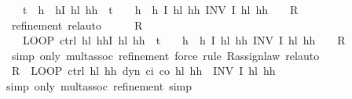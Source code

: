 \documentclass[envcountsame,envcountsect]{llncs}
\begin{document}
\begin{example}
\begin{isabellebody}
\ \ \ {\isacharparenleft}{\isacharparenleft}t\ {\isacharcolon}{\isacharcolon}{\isacharequal}\ {}{\isacharparenright}{\isacharsemicolon}{\isacharparenleft}h\ {\isacharcolon}{\isacharcolon}{\isacharequal}\ h{\isacharparenright}{\isacharsemicolon}\isactrlbold {\isacharbrackleft}I\ h\isactrlsub l\ h\isactrlsub h\ {\isasymand}\ t\ {\isacharequal}\ {}\ {\isasymand}\ h\ {\isacharequal}\ h{\isacharcomma}\ I\ h\isactrlsub l\ h\isactrlsub h\isactrlbold {\isacharbrackright}{\isacharparenright}\ INV\ I\ h\isactrlsub l\ h\isactrlsub h{\isachardoublequoteclose}\ {\isacharparenleft}\ {\isachardoublequoteopen}{\isacharunderscore}\ {\isasymge}\ {\isacharquery}R{\isachardoublequoteclose}{\isacharparenright}\isanewline
\ \ \ \ \isamarkupfalse%
\ {\isacharparenleft}refinement{\isacharcomma}\ rel{\isacharunderscore}auto{\isacharprime}{\isacharparenright}\isanewline
\ \ \isamarkupfalse%
\ \isamarkupfalse%
\ {\isachardoublequoteopen}{\isacharquery}R\ {\isasymge}\isanewline
\ \ \ LOOP\ {\isacharparenleft}ctrl\ h\isactrlsub l\ h\isactrlsub h{\isacharsemicolon}\isactrlbold {\isacharbrackleft}I\ h\isactrlsub l\ h\isactrlsub h\ {\isasymand}\ t\ {\isacharequal}\ {}\ {\isasymand}\ h\ {\isacharequal}\ h{\isacharcomma}\ I\ h\isactrlsub l\ h\isactrlsub h\isactrlbold {\isacharbrackright}{\isacharparenright}\ INV\ I\ h\isactrlsub l\ h\isactrlsub h{\isachardoublequoteclose}\ {\isacharparenleft}\ {\isachardoublequoteopen}{\isacharunderscore}\ {\isasymge}\ {\isacharquery}R{\isachardoublequoteclose}{\isacharparenright}\isanewline
\ \ \ \ \isamarkupfalse%
\ {\isacharparenleft}simp\ only{\isacharcolon}\ mult{\isachardot}assoc{\isacharcomma}\ refinement{\isacharsemicolon}\ {\isacharparenleft}force{\isacharparenright}{\isacharquery}{\isacharcomma}\ {\isacharparenleft}rule\ R{\isacharunderscore}assign{\isacharunderscore}law{\isacharparenright}{\isacharquery}{\isacharparenright}\ rel{\isacharunderscore}auto{\isacharprime}\isanewline
\ \ \isamarkupfalse%
\ \isamarkupfalse%
\ {\isachardoublequoteopen}{\isacharquery}R\ {\isasymge}\ LOOP\ {\isacharparenleft}ctrl\ h\isactrlsub l\ h\isactrlsub h{\isacharsemicolon}\ dyn\ c\isactrlsub i\ c\isactrlsub o\ h\isactrlsub l\ h\isactrlsub h\ {\isasymtau}{\isacharparenright}\ INV\ I\ h\isactrlsub l\ h\isactrlsub h{\isachardoublequoteclose}\isanewline
\ \ \ \ \isamarkupfalse%
{\isacharparenleft}simp\ only{\isacharcolon}\ mult{\isachardot}assoc{\isacharcomma}\ refinement{\isacharsemicolon}\ {\isacharparenleft}simp{\isacharparenright}{\isacharquery}{\isacharparenright}\isanewline

\end{isabellebody}
\end{example}
\end{document}
